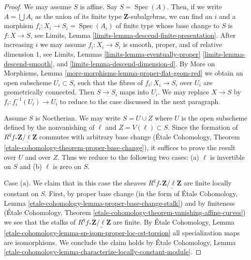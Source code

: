 \documentclass{stacks-project}
\theoremstyle{plain}
\theoremstyle{definition}
\theoremstyle{remark}
\numberwithin{equation}{subsection}
\def\Spec{\mathop{\mathrm{Spec}}}
\begin{document}
\begin{proof}
We may assume $S$ is affine. Say $S = \Spec(A)$. Then, if we write
$A = \bigcup A_i$ as the union of its finite type $\mathbf{Z}$-subalgebras,
we can find an $i$ and a morphism $f_i : X_i \to S_i = \Spec(A_i)$ of finite
type whose base change to $S$ is $f : X \to S$, see
Limits, Lemma \ref{limits-lemma-descend-finite-presentation}.
After increasing $i$ we may assume $f_i : X_i \to S_i$ is
smooth, proper, and of relative dimension $1$, see
Limits, Lemmas
\ref{limits-lemma-eventually-proper}
\ref{limits-lemma-descend-smooth}, and
\ref{limits-lemma-descend-dimension-d}.
By More on Morphisms, Lemma \ref{more-morphisms-lemma-proper-flat-geom-red}
we obtain an open subscheme $U_i \subset S_i$ such that the fibres
of $f_i : X_i \to S_i$ over $U_i$ are geometrically connected.
Then $S \to S_i$ maps into $U_i$. We may replace $X \to S$
by $f_i : f_i^{-1}(U_i) \to U_i$ to reduce to the case
discussed in the next paragraph.

\medskip\noindent
Assume $S$ is Noetherian. We may write $S = U \cup Z$ where $U$ is the
open subscheme defined by the nonvanishing of $\ell$ and
$Z = V(\ell) \subset S$. Since the formation of
$R^qf_*\underline{\mathbf{Z}/\ell\mathbf{Z}}$ commutes with arbitrary
base change (\'Etale Cohomology, Theorem
\ref{etale-cohomology-theorem-proper-base-change}),
it suffices to prove the result over $U$ and over $Z$.
Thus we reduce to the following two cases: (a) $\ell$
is invertible on $S$ and (b) $\ell$ is zero on $S$.

\medskip\noindent
Case (a). We claim that in this case the sheaves
$R^qf_*\underline{\mathbf{Z}/\ell\mathbf{Z}}$ are
finite locally constant on $S$. First, by proper base change
(in the form of \'Etale Cohomology, Lemma
\ref{etale-cohomology-lemma-proper-base-change-stalk})
and by finiteness 
(\'Etale Cohomology, Theorem
\ref{etale-cohomology-theorem-vanishing-affine-curves})
we see that the stalks of $R^qf_*\underline{\mathbf{Z}/\ell\mathbf{Z}}$
are finite. By \'Etale Cohomology, Lemma
\ref{etale-cohomology-lemma-sp-isom-proper-loc-cst-torsion}
all specialization maps are isomorphisms.
We conclude the claim holds by
\'Etale Cohomology, Lemma
\ref{etale-cohomology-lemma-characterize-locally-constant-module}.


\end{proof}
\end{document}
